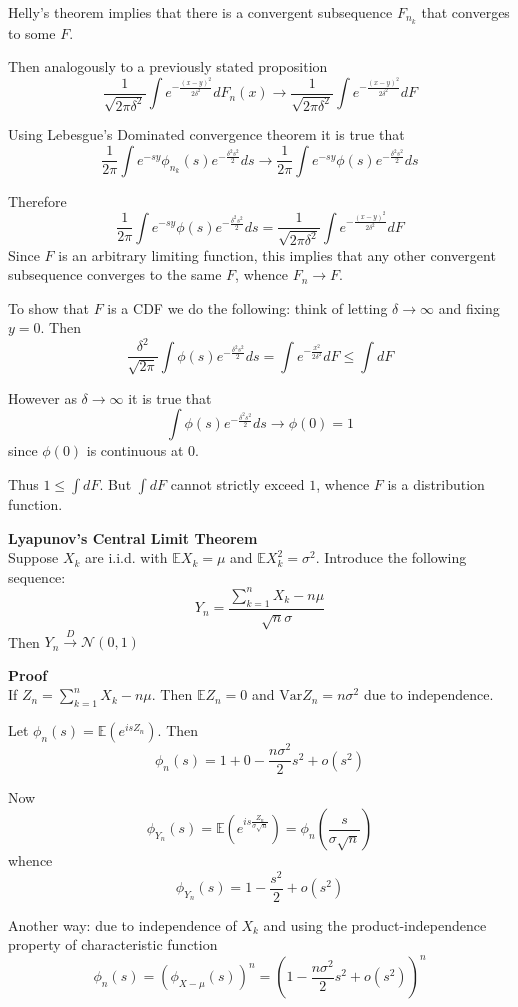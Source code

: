 \documentclass[a4paper]{article}
\newcommand{\brac}[1]{{\left ( #1 \right )}}
\newcommand{\Ex}{\mathbb{E}}
\newcommand{\Var}{\text{Var}}
\begin{document}
Helly's theorem implies that there is a convergent subsequence $F_{n_k}$ that converges to some $F$.

Then analogously to a previously stated proposition
\[\frac{1}{\sqrt{2\pi\delta^2}}\int e^{-\frac{{(x-y)}^2}{2\delta^2}}dF_n(x)
\to \frac{1}{\sqrt{2\pi\delta^2}}\int e^{-\frac{{(x-y)}^2}{2\delta^2}}dF\]

Using Lebesgue's Dominated convergence theorem it is true that
\[\frac{1}{2\pi}\int e^{-sy} \phi_{n_k}(s) e^{-\frac{\delta^2 s^2}{2}}ds
\to \frac{1}{2\pi}\int e^{-sy} \phi(s) e^{-\frac{\delta^2 s^2}{2}}ds\]

Therefore
\[\frac{1}{2\pi}\int e^{-sy} \phi(s) e^{-\frac{\delta^2 s^2}{2}}ds
= \frac{1}{\sqrt{2\pi\delta^2}}\int e^{-\frac{{(x-y)}^2}{2\delta^2}}dF\]
Since $F$ is an arbitrary limiting function, this implies that any other convergent subsequence converges to the same $F$, whence $F_n\to F$.

To show that $F$ is a CDF we do the following: think of letting $\delta\to \infty$ and fixing $y=0$. Then
\[\frac{\delta^2}{\sqrt{2\pi}}\int \phi(s) e^{-\frac{\delta^2 s^2}{2}}ds
= \int e^{-\frac{x^2}{2\delta^2}}dF \leq \int dF\]

However as $\delta\to\infty$ it is true that
\[\int \phi(s) e^{-\frac{\delta^2 s^2}{2}}ds\to \phi(0) = 1\]
since $\phi(0)$ is continuous at $0$.

Thus $1 \leq \int dF$. But $\int dF$ cannot strictly exceed $1$, whence $F$ is a distribution function.

\noindent\textbf{Lyapunov's Central Limit Theorem} \hfill\\
Suppose $X_k$ are i.i.d. with $\Ex X_k = \mu$ and $\Ex X_k^2 = \sigma^2$. Introduce the following sequence:
\[Y_n = \frac{\sum_{k=1}^n X_k - n \mu }{\sqrt{n}\sigma}\]
Then $Y_n\overset{D}{\to}\mathcal{N}(0,1)$

\textbf{Proof}\hfill\\

If $Z_n = \sum_{k=1}^n X_k - n\mu$. Then $\Ex Z_n = 0$ and $\Var Z_n = n \sigma^2$ due to independence.

Let $\phi_n(s) = \Ex\brac{e^{isZ_n}}$. Then
\[\phi_n(s) = 1 + 0 - \frac{n\sigma^2}{2} s^2 + o(s^2)\]

Now
\[\phi_{Y_n}(s) = \Ex\brac{e^{is\frac{Z_n}{\sigma \sqrt{n}}}} = \phi_n(\frac{s}{\sigma\sqrt{n}})\]
whence
\[\phi_{Y_n}(s) = 1 - \frac{s^2}{2} + o(s^2)\]


Another way: due to independence of $X_k$ and using the product-independence property of characteristic function
\[\phi_n(s) = \brac{\phi_{X-\mu}(s)}^n = \brac{ 1 - \frac{n\sigma^2}{2} s^2 + o(s^2) }^n\]
\end{document}
